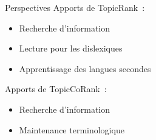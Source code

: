 
  \begin{frame}{Perspectives}
    Apports de TopicRank~:
    \begin{itemize}
      \item{Recherche d'information~\cite{jones1999phrasier}}
      \item{Lecture pour les dislexiques~\cite{rello2014dislexia}}
      \item{Apprentissage des langues secondes~\cite{pressley1982mnemonickeywordmethod}}
    \end{itemize}

    \vspace{1em}

    Apports de TopicCoRank~:
    \begin{itemize}
      \item{Recherche d'information~\cite{jones1999phrasier}}
      \item{Maintenance terminologique}
    \end{itemize}
  \end{frame}

